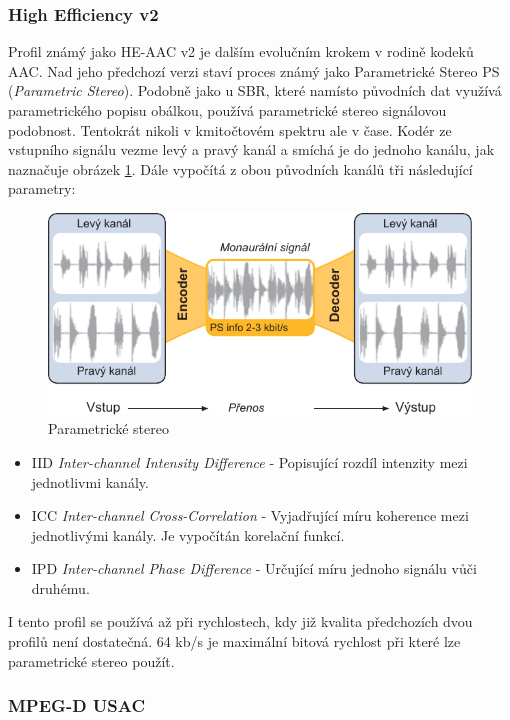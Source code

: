 \subsubsection{High Efficiency v2}
    
Profil známý jako HE-AAC v2 je dalším evolučním krokem v rodině kodeků AAC. Nad jeho předchozí verzi staví proces známý jako Parametrické Stereo PS (\textit{Parametric Stereo}). Podobně jako u SBR, které namísto původních dat využívá parametrického popisu obálkou, používá parametrické stereo signálovou podobnost. Tentokrát nikoli v kmitočtovém spektru ale v čase. Kodér ze vstupního signálu vezme levý a pravý kanál a smíchá je do jednoho  kanálu, jak naznačuje obrázek \ref{pic:ps}. Dále vypočítá z obou původních kanálů tři následující parametry:

    \begin{figure}[h]
        \centering
        \includegraphics[width=.7\textwidth]{pic/parametricalStereo.pdf}
        \caption{Parametrické stereo \cite{article:aac}}
        \label{pic:ps}
    \end{figure}
    
    \begin{itemize}
        \item IID \textit{Inter-channel Intensity Difference} - Popisující rozdíl intenzity mezi jednotlivmi kanály. 
        \item ICC \textit{Inter-channel Cross-Correlation} - Vyjadřující míru koherence mezi jednotlivými kanály. Je vypočítán korelační funkcí.
        \item IPD \textit{Inter-channel Phase Difference} - Určující míru  jednoho signálu vůči druhému.
    \end{itemize}
    
I tento profil se používá až při rychlostech, kdy již kvalita předchozích dvou profilů není dostatečná. 64 kb/s je maximální bitová rychlost při které lze parametrické stereo použít.
    
    \subsubsection{MPEG-D USAC}
    
